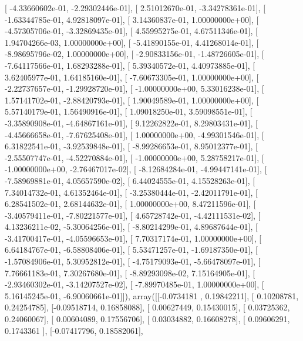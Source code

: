 \documentclass{article}
\begin{document}
       [ -4.33660602e-01,  -2.29302446e-01],
       [  2.51012670e-01,  -3.34278361e-01],
       [ -1.63344785e-01,   4.92818097e-01],
       [  3.14360837e-01,   1.00000000e+00],
       [ -4.57305706e-01,  -3.32869435e-01],
       [  4.55995275e-01,   4.67511346e-01],
       [  1.94704266e-03,   1.00000000e+00],
       [ -5.41890155e-01,   4.41268014e-01],
       [ -8.98695796e-02,   1.00000000e+00],
       [ -2.90833156e-01,  -1.48726605e-01],
       [ -7.64117566e-01,   1.68293288e-01],
       [  5.39340572e-01,   4.40973885e-01],
       [  3.62405977e-01,   1.64185160e-01],
       [ -7.60673305e-01,   1.00000000e+00],
       [ -2.22737657e-01,  -1.29928720e-01],
       [ -1.00000000e+00,   5.33016238e-01],
       [  1.57141702e-01,  -2.88420793e-01],
       [  1.90049589e-01,   1.00000000e+00],
       [  5.57140179e-01,   1.56490916e-01],
       [  1.09018250e-01,   3.59098551e-01],
       [ -3.35890908e-01,  -4.64867161e-01],
       [  9.12262822e-01,   8.29803431e-01],
       [ -4.45666658e-01,  -7.67625408e-01],
       [  1.00000000e+00,  -4.99301546e-01],
       [  6.31822541e-01,  -3.92539848e-01],
       [ -8.99286653e-01,   8.95012377e-01],
       [ -2.55507747e-01,  -4.52270884e-01],
       [ -1.00000000e+00,   5.28758217e-01],
       [ -1.00000000e+00,  -2.76467017e-02],
       [ -8.12684284e-01,  -4.99447141e-01],
       [ -7.58969881e-01,   4.05657590e-02],
       [  6.44024555e-01,   4.15528263e-01],
       [  7.34014732e-01,   4.61352464e-01],
       [ -3.25380444e-01,  -2.42011791e-01],
       [  6.28541502e-01,   2.68144632e-01],
       [  1.00000000e+00,   8.47211596e-01],
       [ -3.40579411e-01,  -7.80221577e-01],
       [  4.65728742e-01,  -4.42111531e-02],
       [  4.13236211e-02,  -5.30064256e-01],
       [ -8.80214299e-01,   4.89687644e-01],
       [ -3.41700417e-01,  -4.05596653e-01],
       [  7.70317174e-01,   1.00000000e+00],
       [  6.64184767e-01,  -6.58808406e-01],
       [  5.53471257e-01,  -1.69187350e-01],
       [ -1.57084906e-01,   5.30952812e-01],
       [ -4.75179093e-01,  -5.66478097e-01],
       [  7.76661183e-01,   7.30267680e-01],
       [ -8.89293098e-02,   7.15164905e-01],
       [ -2.93460302e-01,  -3.14207527e-02],
       [ -7.89970485e-01,   1.00000000e+00],
       [  5.16145245e-01,  -6.90060661e-01]]), array([[-0.0734181 ,  0.19842211],
       [ 0.10208781,  0.24254785],
       [-0.09518714,  0.16858088],
       [ 0.00627449,  0.15430015],
       [ 0.03725362,  0.24060067],
       [ 0.00604089,  0.17556706],
       [ 0.03034882,  0.16608278],
       [ 0.09606291,  0.1743361 ],
       [-0.07417796,  0.18582061],
\end{document}
